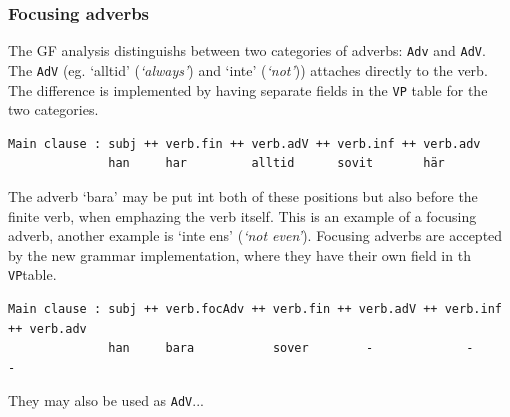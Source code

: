 \documentclass{report}
\begin{document}
\subsubsection{Focusing adverbs}
The GF analysis distinguishs between two categories of adverbs: \verb-Adv- 
and \verb-AdV-. %
The \verb-AdV- (eg. `alltid' (\emph{`always'}) and `inte' (\emph{`not'}))
attaches directly to the verb.
The difference is implemented by having separate fields in the \verb-VP- table
for the two categories.
\begin{verbatim}
Main clause : subj ++ verb.fin ++ verb.adV ++ verb.inf ++ verb.adv
              han     har         alltid      sovit       här 
\end{verbatim}
The adverb `bara' may be put int both of these positions but also before the finite verb,
when emphazing the verb itself.
This is an example of a focusing adverb, another example is `inte ens' (\emph{`not even'}).
Focusing adverbs are accepted by the new grammar implementation, where they have
their own field in th \verb-VP-table.
\begin{verbatim}
Main clause : subj ++ verb.focAdv ++ verb.fin ++ verb.adV ++ verb.inf ++ verb.adv
              han     bara           sover        -             -           -
\end{verbatim}
They may also be used as \verb-AdV-...
\end{document}
